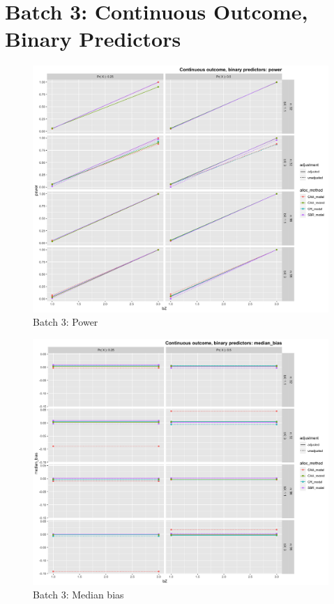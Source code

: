 \section[Continuous Y, binary X]{Batch 3: Continuous Outcome, Binary Predictors}

\begin{figure}[H]
	\includegraphics[width=\linewidth]{figures/b3_power_all_methods_adj_unadj}
	\caption{Batch 3: Power}
	\label{fig:c7b3p}
\end{figure}

\begin{figure}[H]
	\includegraphics[width=\linewidth]{figures/b3_median_bias_all_methods_adj_unadj}
	\caption{Batch 3: Median bias}
	\label{fig:b3mb}
\end{figure}

